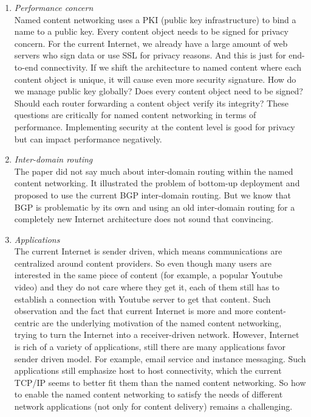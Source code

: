 \documentclass[11pt]{article}
\begin{document}
\begin{enumerate}
\item \emph{Performance concern}\\ Named content networking uses a PKI
  (public key infrastructure) 
  to bind a name to a public key. Every content object needs to be
  signed for privacy concern. For the current Internet, we already have a large amount of
  web servers who sign data or use SSL for privacy reasons. And this
  is just for end-to-end connectivity. If we shift the architecture to
  named content where each content object is unique, it will cause
  even more security signature. How do we 
  manage public key globally? Does every content object need to be
  signed? Should each router forwarding a content object verify its integrity?
  These questions are critically for named content networking
  in terms of performance. Implementing security at the content level is good
  for privacy but can impact performance negatively.
\item \emph{Inter-domain routing}\\
  The paper did not say much about inter-domain routing within the named
  content networking. It illustrated the problem of bottom-up
  deployment and proposed to use the current BGP inter-domain
  routing. But we know that BGP is problematic by its own and
  using an old inter-domain routing for a completely new Internet
  architecture does not sound that convincing.
\item \emph{Applications}\\
  The current Internet is sender driven, which means communications
  are centralized around content providers. So even though many users
  are interested in the same piece of content (for example, a popular
  Youtube video) and they do not care where they get it, each of them
  still has to establish a connection with Youtube server to get that
  content. Such observation and the fact that current Internet is more
  and more content-centric are the underlying motivation of the named
  content networking, trying to turn the Internet into a
  receiver-driven network. However, Internet is rich of a variety of
  applications, still there are many applications favor sender driven
  model. For example, email service and instance messaging. Such
  applications still emphasize host to host connectivity, which the
  current TCP/IP seems to better fit them than the named content
  networking. So how to enable the named content networking to satisfy
  the needs of different network applications (not only for content
  delivery) remains a challenging.
\end{enumerate}

\vspace{1em}
\end{document}
